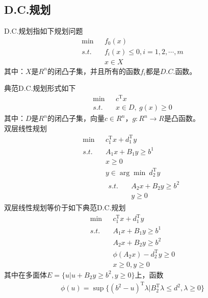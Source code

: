     \subsection{D.C.规划}
        \par
        D.C.规划指如下规划问题
        \begin{align*}
        \mathop{\min}\  &f_0(x)\\
        s.t.\quad &f_i(x) \leqslant 0,i=1,2,\cdots,m\\
        & x\in X
        \end{align*}
        其中：$X$是$R^n$的闭凸子集，并且所有的函数$f_i$都是$D.C.$函数。
        \par
        典范D.C.规划形式如下
        \begin{align*}
        \mathop{\min}\  &c^\mathrm{T} x\\
        s.t.\quad & x\in D,\ g(x)\geqslant 0
        \end{align*}
        其中：$D$是$R^n$的闭凸子集，向量$c\in R^n$，$g:R^n\to R$是凸函数。\\
        双层线性规划
        \begin{align*}
        \mathop{\min}\  &c_1^\mathrm{T} x+d_1^\mathrm{T} y\\
        s.t.\quad & A_1x+B_1y\geqslant b^1\\
        & x\geqslant 0\\
        &y\in {\arg\min} \  d_2^\mathrm{T} y\\
        & \begin{aligned}
        s.t. \quad &A_2x+B_2y\geqslant b^2\\
        & y\geqslant 0
        \end{aligned}
        \end{align*}
        双层线性规划等价于如下典范D.C.规划
        \begin{align*}
        \mathop{\min}\  &c_1^\mathrm{T} x+d_1^\mathrm{T} y\\
        s.t.\quad & A_1x+B_1y\geqslant b^1\\
        & A_2x+B_2y\geqslant b^2\\
        & \phi(A_2x)-d_2^\mathrm{T} y\geqslant 0\\
        & x\geqslant 0,y\geqslant 0
        \end{align*}
        其中在多面体$E=\{u|u+B_2y\geqslant b^2,y \geqslant 0\}$上，函数
        \begin{align*}
        \phi(u)={\sup}\{(b^2-u)^\mathrm{T} \lambda|B_2^\mathrm{T} \lambda \leqslant d^2,\lambda \geqslant 0\}
        \end{align*}

